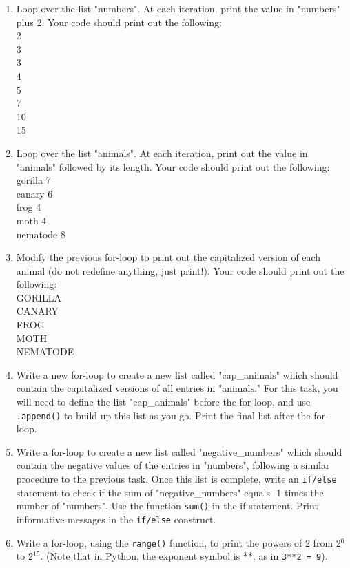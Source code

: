 \documentclass{article}[12pt]
\newcommand{\code}[1]{\texttt{#1}}  %
\begin{document}
\begin{enumerate}

    \item Loop over the list "numbers". At each iteration, print the value in "numbers" plus 2. Your code should print out the following:\\
        2 \\ 
        3 \\
        3 \\
        4 \\
        5 \\
        7 \\
        10 \\
        15 \\
    \item Loop over the list "animals". At each iteration, print out the value in "animals" followed by its length. Your code should print out the following:\\
        gorilla 7 \\
        canary 6  \\
        frog 4    \\
        moth 4     \\
        nematode 8  \\
    \item Modify the previous for-loop to print out the capitalized version of each animal (do not redefine anything, just print!). Your code should print out the following:\\
        GORILLA \\
        CANARY  \\
        FROG    \\
        MOTH     \\
        NEMATODE  \\
    \item Write a new for-loop to create a new list called "cap\_animals" which should contain the capitalized versions of all entries in "animals." For this task, you will need to define the list "cap\_animals" before the for-loop, and use \code{.append()} to build up this list as you go. Print the final list after the for-loop.
    \item Write a for-loop to create a new list called "negative\_numbers" which should contain the negative values of the entries in "numbers", following a similar procedure to the previous task. Once this list is complete, write an \code{if/else} statement to check if the sum of "negative\_numbers" equals -1 times the number of "numbers". Use the function \code{sum()} in the if statement. Print informative messages in the \code{if/else} construct.

	\item Write a for-loop, using the \code{range()} function, to print the powers of 2 from 2$^0$ to 2$^{15}$. (Note that in Python, the exponent symbol is **, as in \code{3**2 = 9}).
	

\end{enumerate}
\end{document}
